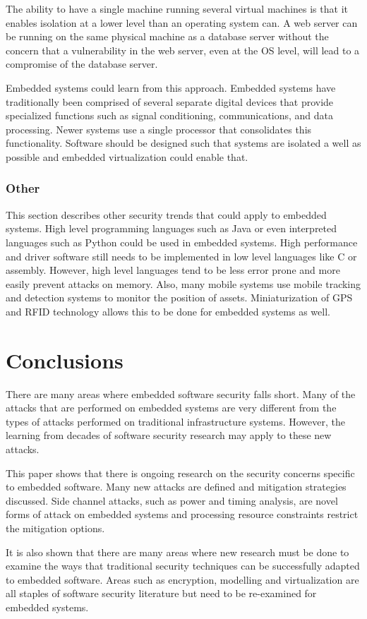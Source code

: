 \documentclass[final,conference,11pt]{IEEEtran}
\begin{document}
The ability to have a single machine running several virtual machines is that it enables isolation at a lower level than an operating system can.  A web server can be running on the same physical machine as a database server without the concern that a vulnerability in the web server, even at the OS level, will lead to a compromise of the database server.

Embedded systems could learn from this approach.  Embedded systems have traditionally been comprised of several separate digital devices that provide specialized functions such as signal conditioning, communications, and data processing.  Newer systems use a single processor that consolidates this functionality.  Software should be designed such that systems are isolated a well as possible and embedded virtualization could enable that.  

\subsubsection{Other}
This section describes other security trends that could apply to embedded systems.  High level programming languages such as Java or even interpreted languages such as Python could be used in embedded systems.  High performance and driver software still needs to be implemented in low level languages like C or assembly. However, high level languages tend to be less error prone and more easily prevent attacks on memory.  Also, many mobile systems use mobile tracking and detection systems to monitor the position of assets.  Miniaturization of GPS and RFID technology allows this to be done for embedded systems as well. 

\section{Conclusions}

There are many areas where embedded software security falls short.  Many of the attacks that are performed on embedded systems are very different from the types of attacks performed on traditional infrastructure systems.  However, the learning from decades of software security research may apply to these new attacks.  

This paper shows that there is ongoing research on the security concerns specific to embedded software.  Many new attacks are defined and mitigation strategies discussed.  Side channel attacks, such as power and timing analysis, are novel forms of attack on embedded systems and processing resource constraints restrict the mitigation options. 

It is also shown that there are many areas where new research must be done to examine the ways that traditional security techniques can be successfully adapted to embedded software. Areas such as encryption, modelling and virtualization are all staples of software security literature but need to be re-examined for embedded systems.



\pagebreak
\end{document}
